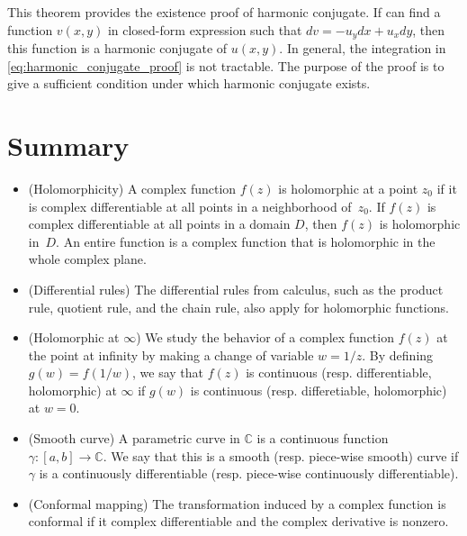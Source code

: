 This theorem provides the existence proof of harmonic conjugate. If can find a function $v(x,y)$ in closed-form expression such that $dv = -u_y dx + u_x dy$, then this function is a harmonic conjugate of $u(x,y)$. In general, the integration in \eqref{eq:harmonic_conjugate_proof} is not tractable. The purpose of the proof is to give a sufficient condition under which harmonic conjugate exists. 








\section*{Summary}

\begin{itemize}
	\item (Holomorphicity) A complex function $f(z)$ is holomorphic at a point $z_0$ if it is complex differentiable at all points in a neighborhood of~$z_0$. If $f(z)$ is complex differentiable at all points in a domain $D$, then $f(z)$ is holomorphic in~$D$. An entire function is a complex function that is holomorphic in the whole complex plane.





	
	\item (Differential rules) The differential rules from calculus, such as the product rule, quotient rule, and the chain rule, also apply for holomorphic functions.
	
	
\item (Holomorphic at $\infty$) We study the behavior of a complex function $f(z)$ at the point at infinity by making a change of variable $w=1/z$. By defining $g(w)=f(1/w)$, we say that $f(z)$ is continuous (resp. differentiable, holomorphic) at $\infty$ if $g(w)$ is continuous (resp. differetiable, holomorphic) at $w=0$.

\item (Smooth curve) A parametric curve in $\mathbb{C}$ is a continuous function $\gamma: [a,b]\rightarrow \mathbb{C}$. We say that this is a smooth (resp. piece-wise smooth) curve if $\gamma$ is a continuously differentiable (resp. piece-wise continuously differentiable). 

\item (Conformal mapping) The transformation induced by a complex function is conformal if it complex differentiable and the complex derivative is nonzero.	
	

\end{itemize}
